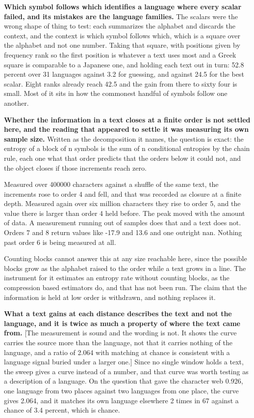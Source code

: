 \textbf{Which symbol follows which identifies a language where every scalar failed, and its mistakes are the language families.} The scalars were the wrong shape of thing to test: each summarizes the alphabet and discards the context, and the context is which symbol follows which, which is a square over the alphabet and not one number. Taking that square, with positions given by frequency rank so the first position is whatever a text uses most and a Greek square is comparable to a Japanese one, and holding each text out in turn: 52.8 percent over 31 languages against 3.2 for guessing, and against 24.5 for the best scalar. Eight ranks already reach 42.5 and the gain from there to sixty four is small. Most of it sits in how the commonest handful of symbols follow one another.

\textbf{Whether the information in a text closes at a finite order is not settled here, and the reading that appeared to settle it was measuring its own sample size.} Written as the decomposition it names, the question is exact: the entropy of a block of n symbols is the sum of n conditional entropies by the chain rule, each one what that order predicts that the orders below it could not, and the object closes if those increments reach zero.

Measured over 400000 characters against a shuffle of the same text, the increments rose to order 4 and fell, and that was recorded as closure at a finite depth. Measured again over six million characters they rise to order 5, and the value there is larger than order 4 held before. The peak moved with the amount of data. A measurement running out of samples does that and a text does not. Orders 7 and 8 return values like -17.9 and 13.6 and one outright nan. Nothing past order 6 is being measured at all.

Counting blocks cannot answer this at any size reachable here, since the possible blocks grow as the alphabet raised to the order while a text grows in a line. The instrument for it estimates an entropy rate without counting blocks, as the compression based estimators do, and that has not been run. The claim that the information is held at low order is withdrawn, and nothing replaces it.

\textbf{What a text gains at each distance describes the text and not the language, and it is twice as much a property of where the text came from.} [The measurement is sound and the wording is not. It shows the curve carries the source more than the language, not that it carries nothing of the language, and a ratio of 2.064 with matching at chance is consistent with a language signal buried under a larger one.] Since no single window holds a text, the sweep gives a curve instead of a number, and that curve was worth testing as a description of a language. On the question that gave the character web 0.926, one language from two places against two languages from one place, the curve gives 2.064, and it matches its own language elsewhere 2 times in 67 against a chance of 3.4 percent, which is chance.

